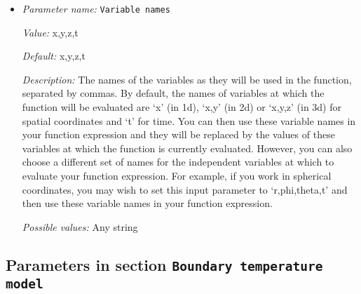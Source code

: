 \begin{itemize}
{\it Value:} 0


{\it Default:} 0


{\it Description:} The formula that denotes the function you want to evaluate for particular values of the independent variables. This expression may contain any of the usual operations such as addition or multiplication, as well as all of the common functions such as `sin' or `cos'. In addition, it may contain expressions like `if(x>0, 1, -1)' where the expression evaluates to the second argument if the first argument is true, and to the third argument otherwise. For a full overview of possible expressions accepted see the documentation of the muparser library at http://muparser.beltoforion.de/.

If the function you are describing represents a vector-valued function with multiple components, then separate the expressions for individual components by a semicolon.


{\it Possible values:} Any string
\item {\it Parameter name:} {\tt Variable names}
\label{parameters:Boundary heat flux model/Function/Variable names}
\label{parameters:Boundary_20heat_20flux_20model/Function/Variable_20names}


{\it Value:} x,y,z,t


{\it Default:} x,y,z,t


{\it Description:} The names of the variables as they will be used in the function, separated by commas. By default, the names of variables at which the function will be evaluated are `x' (in 1d), `x,y' (in 2d) or `x,y,z' (in 3d) for spatial coordinates and `t' for time. You can then use these variable names in your function expression and they will be replaced by the values of these variables at which the function is currently evaluated. However, you can also choose a different set of names for the independent variables at which to evaluate your function expression. For example, if you work in spherical coordinates, you may wish to set this input parameter to `r,phi,theta,t' and then use these variable names in your function expression.


{\it Possible values:} Any string
\end{itemize}

\subsection{Parameters in section \tt Boundary temperature model}
\label{parameters:Boundary_20temperature_20model}

